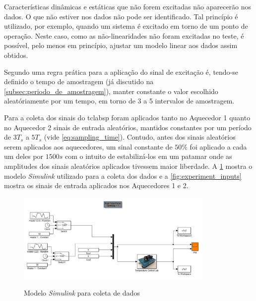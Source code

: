 \begin{citacao}
    Características dinâmicas e estáticas que não forem excitadas não aparecerão nos dados. O que
    não estiver nos dados não pode ser identificado. Tal princípio é utilizado, por exemplo,
    quando um sistema é excitado em torno de um ponto de operação. Neste caso, como as não-linearidades
    não foram excitadas no teste, é possível, pelo menos em princípio, ajustar um modelo linear
    aos dados assim obtidos. \cite{Aguirre2015}
\end{citacao}

Segundo  uma regra prática para a aplicação do sinal de excitação é,
tendo-se definido o tempo de amostragem (já discutido na \cref{subsec:periodo_de_amostragem}),
manter constante o valor escolhido aleatóriamente por um tempo, em torno de 3 a 5 intervalos de
amostragem.

Para a coleta dos sinais do \acrshort{tclabsp} foram aplicados tanto no Aquecedor 1 quanto no
Aquecedor 2 sinais de entrada aleatórios, mantidos constantes por um período de $3T_s$ a $5T_s$
(vide \cref{eq:sampling_time}). Contudo, antes dos sinais aleatórios serem aplicados aos
aquecedores, um sinal constante de $50\%$ foi aplicado a cada um deles por $1500s$ com o intuito
de estabilizá-los em um patamar onde as amplitudes dos sinais aleatórios aplicados tivessem
maior liberdade. A \cref{fig:simulink_coleta} mostra o modelo \textit{Simulink} utilizado para
a coleta dos dados e a \cref{fig:experiment_inputs} mostra os sinais de entrada aplicados nos
Aquecedores 1 e 2.

\begin{figure}[h]
	\caption{Modelo \textit{Simulink} para coleta de dados}
	\begin{center}
		\includegraphics[width=0.85\textwidth]{./5_images/SimulinkColeta.png} 
		\label{fig:simulink_coleta}
	\end{center}
	\centering
\end{figure}

